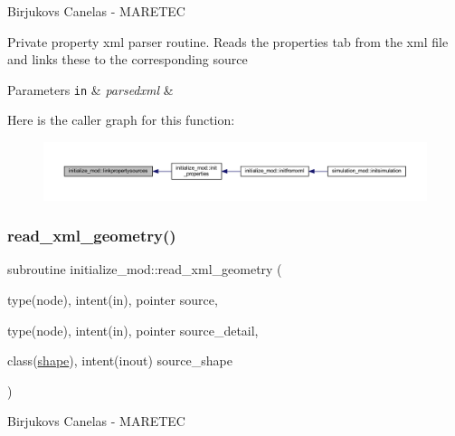 Birjukovs Canelas -\/ M\+A\+R\+E\+T\+EC 

Private property xml parser routine. Reads the properties tab from the xml file and links these to the corresponding source 
\begin{DoxyParams}[1]{Parameters}
\mbox{\tt in}  & {\em parsedxml} & \\
\hline
\end{DoxyParams}
Here is the caller graph for this function\+:
\nopagebreak
\begin{figure}[H]
\begin{center}
\leavevmode
\includegraphics[width=350pt]{namespaceinitialize__mod_af38ade977df8d56db1d125bc4cc03a4a_icgraph}
\end{center}
\end{figure}
\mbox{\label{namespaceinitialize__mod_aebe8236f74bc6665b16463683c478602}} 
\subsubsection{\texorpdfstring{read\+\_\+xml\+\_\+geometry()}{read\_xml\_geometry()}}
{\footnotesize\ttfamily subroutine initialize\+\_\+mod\+::read\+\_\+xml\+\_\+geometry (\begin{DoxyParamCaption}\item[{type(node), intent(in), pointer}]{source,  }\item[{type(node), intent(in), pointer}]{source\+\_\+detail,  }\item[{class(\hyperlink{structgeometry__mod_1_1shape}{shape}), intent(inout)}]{source\+\_\+shape }\end{DoxyParamCaption})\hspace{0.3cm}{\ttfamily [private]}}



Birjukovs Canelas -\/ M\+A\+R\+E\+T\+EC 

